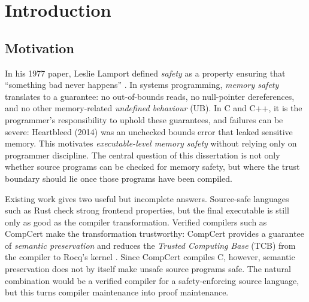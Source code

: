 

\chapter{Introduction}\label{ch:intro}

\section{Motivation}

In his 1977 paper, Leslie Lamport defined \emph{safety} as a property ensuring that ``something bad never happens'' \cite{Lamport1977Proving}. In systems programming, \emph{memory safety} translates to a guarantee: no out-of-bounds reads, no null-pointer dereferences, and no other memory-related \emph{undefined behaviour} (UB). In C and C++, it is the programmer's responsibility to uphold these guarantees, and failures can be severe: Heartbleed (2014) \cite{CVE-2014-0160} was an unchecked bounds error that leaked sensitive memory. This motivates \emph{executable-level memory safety} without relying only on programmer discipline. The central question of this dissertation is not only whether source programs can be checked for memory safety, but where the trust boundary should lie once those programs have been compiled.

Existing work gives two useful but incomplete answers. Source-safe languages such as Rust check strong frontend properties, but the final executable is still only as good as the compiler transformation. Verified compilers such as CompCert \cite{compcert} make the transformation trustworthy: CompCert provides a guarantee of \emph{semantic preservation} and reduces the \emph{Trusted Computing Base} (TCB) from the compiler to Rocq's kernel \cite{RocqRefman}. Since CompCert compiles C, however, semantic preservation does not by itself make unsafe source programs safe. The natural combination would be a verified compiler for a safety-enforcing source language, but this turns compiler maintenance into proof maintenance.

